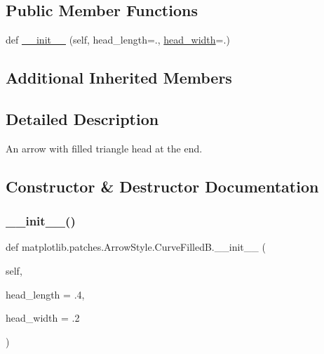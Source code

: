 \subsection*{Public Member Functions}
\begin{DoxyCompactItemize}
\item 
def \hyperlink{classmatplotlib_1_1patches_1_1ArrowStyle_1_1CurveFilledB_a1febba2ced76d8043308873e56d9fd96}{\+\_\+\+\_\+init\+\_\+\+\_\+} (self, head\+\_\+length=., \hyperlink{classmatplotlib_1_1patches_1_1ArrowStyle_1_1__Curve_a360e40f4780784399d97fd36b8569ab7}{head\+\_\+width}=.)
\end{DoxyCompactItemize}
\subsection*{Additional Inherited Members}


\subsection{Detailed Description}
\begin{DoxyVerb}An arrow with filled triangle head at the end.\end{DoxyVerb}
 

\subsection{Constructor \& Destructor Documentation}
\mbox{\label{classmatplotlib_1_1patches_1_1ArrowStyle_1_1CurveFilledB_a1febba2ced76d8043308873e56d9fd96}} 
\subsubsection{\texorpdfstring{\+\_\+\+\_\+init\+\_\+\+\_\+()}{\_\_init\_\_()}}
{\footnotesize\ttfamily def matplotlib.\+patches.\+Arrow\+Style.\+Curve\+Filled\+B.\+\_\+\+\_\+init\+\_\+\+\_\+ (\begin{DoxyParamCaption}\item[{}]{self,  }\item[{}]{head\+\_\+length = {\ttfamily .4},  }\item[{}]{head\+\_\+width = {\ttfamily .2} }\end{DoxyParamCaption})}

